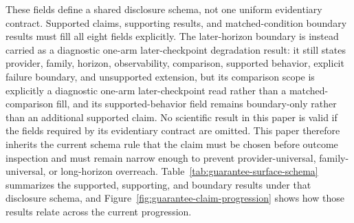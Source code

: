 \documentclass[11pt]{article}
\renewcommand{\_}{\textunderscore\hspace{0pt}}
\begin{document}
These fields define a shared disclosure schema, not one uniform evidentiary
contract. Supported claims, supporting results, and matched-condition boundary
results must fill all eight fields explicitly. The later-horizon boundary is
instead carried as a diagnostic one-arm later-checkpoint degradation result:
it still states provider, family, horizon, observability, comparison, supported
behavior, explicit failure boundary, and unsupported extension, but its
comparison scope is explicitly a diagnostic one-arm later-checkpoint read
rather than a matched-comparison fill, and its supported-behavior field remains
boundary-only rather than an additional supported claim. No scientific result
in this paper is valid if the fields required by its evidentiary contract are
omitted. This paper therefore inherits the current schema rule that the claim
must be chosen before outcome inspection and must remain narrow enough
to prevent provider-universal, family-universal, or long-horizon overreach.
Table~\ref{tab:guarantee-surface-schema} summarizes the supported,
supporting, and boundary results under that disclosure schema, and
Figure~\ref{fig:guarantee-claim-progression} shows how those results relate
across the current progression.
\end{document}

